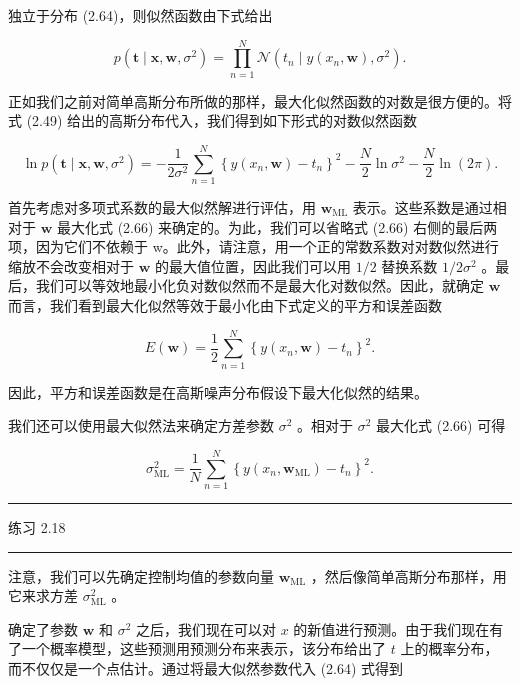 \documentclass[10pt]{article}
\newcommand{\HRule}{\begin{center}\rule{0.9\linewidth}{0.2mm}\end{center}}
\begin{document}
独立于分布 (2.64)，则似然函数由下式给出

\[
p\left( {\mathbf{t} \mid  \mathbf{x},\mathbf{w},{\sigma }^{2}}\right)  = \mathop{\prod }\limits_{{n = 1}}^{N}\mathcal{N}\left( {{t}_{n} \mid  y\left( {{x}_{n},\mathbf{w}}\right) ,{\sigma }^{2}}\right) . \tag{2.65}
\]

正如我们之前对简单高斯分布所做的那样，最大化似然函数的对数是很方便的。将式 (2.49) 给出的高斯分布代入，我们得到如下形式的对数似然函数

\[
\ln p\left( {\mathbf{t} \mid  \mathbf{x},\mathbf{w},{\sigma }^{2}}\right)  =  - \frac{1}{2{\sigma }^{2}}\mathop{\sum }\limits_{{n = 1}}^{N}{\left\{  y\left( {x}_{n},\mathbf{w}\right)  - {t}_{n}\right\}  }^{2} - \frac{N}{2}\ln {\sigma }^{2} - \frac{N}{2}\ln \left( {2\pi }\right) . \tag{2.66}
\]

首先考虑对多项式系数的最大似然解进行评估，用 \({\mathbf{w}}_{\mathrm{{ML}}}\) 表示。这些系数是通过相对于 \(\mathbf{w}\) 最大化式 (2.66) 来确定的。为此，我们可以省略式 (2.66) 右侧的最后两项，因为它们不依赖于 w。此外，请注意，用一个正的常数系数对对数似然进行缩放不会改变相对于 \(\mathbf{w}\) 的最大值位置，因此我们可以用 \(1/2\) 替换系数 \(1/2{\sigma }^{2}\) 。最后，我们可以等效地最小化负对数似然而不是最大化对数似然。因此，就确定 \(\mathbf{w}\) 而言，我们看到最大化似然等效于最小化由下式定义的平方和误差函数

\[
E\left( \mathbf{w}\right)  = \frac{1}{2}\mathop{\sum }\limits_{{n = 1}}^{N}{\left\{  y\left( {x}_{n},\mathbf{w}\right)  - {t}_{n}\right\}  }^{2}. \tag{2.67}
\]

因此，平方和误差函数是在高斯噪声分布假设下最大化似然的结果。

我们还可以使用最大似然法来确定方差参数 \({\sigma }^{2}\) 。相对于 \({\sigma }^{2}\) 最大化式 (2.66) 可得

\[
{\sigma }_{\mathrm{{ML}}}^{2} = \frac{1}{N}\mathop{\sum }\limits_{{n = 1}}^{N}{\left\{  y\left( {x}_{n},{\mathbf{w}}_{\mathrm{{ML}}}\right)  - {t}_{n}\right\}  }^{2}. \tag{2.68}
\]

\HRule

练习 2.18

\HRule

注意，我们可以先确定控制均值的参数向量 \({\mathbf{w}}_{\mathrm{{ML}}}\) ，然后像简单高斯分布那样，用它来求方差 \({\sigma }_{\mathrm{{ML}}}^{2}\) 。

确定了参数 \(\mathbf{w}\) 和 \({\sigma }^{2}\) 之后，我们现在可以对 \(x\) 的新值进行预测。由于我们现在有了一个概率模型，这些预测用预测分布来表示，该分布给出了 \(t\) 上的概率分布，而不仅仅是一个点估计。通过将最大似然参数代入 (2.64) 式得到
\end{document}
